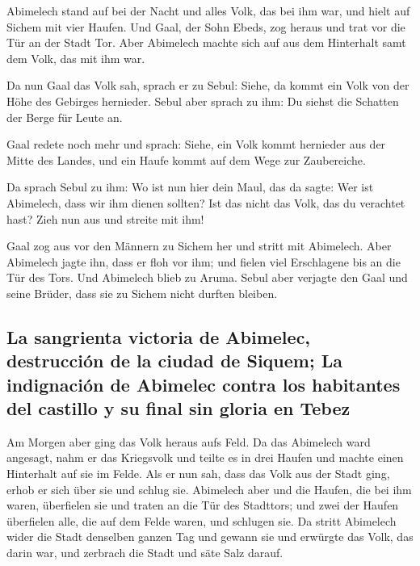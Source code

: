  Abimelech stand auf bei der Nacht und alles Volk, das
bei ihm war, und hielt auf Sichem mit vier Haufen.  Und
Gaal, der Sohn Ebeds, zog heraus und trat vor die Tür an der Stadt Tor.
Aber Abimelech machte sich auf aus dem Hinterhalt samt dem Volk, das mit
ihm war.

 Da nun Gaal das Volk sah, sprach er zu Sebul: Siehe, da
kommt ein Volk von der Höhe des Gebirges hernieder. Sebul aber sprach zu
ihm: Du siehst die Schatten der Berge für Leute an.

 Gaal redete noch mehr und sprach: Siehe, ein Volk kommt
hernieder aus der Mitte des Landes, und ein Haufe kommt auf dem Wege zur
Zaubereiche.

 Da sprach Sebul zu ihm: Wo ist nun hier dein Maul, das
da sagte: Wer ist Abimelech, dass wir ihm dienen sollten? Ist das nicht
das Volk, das du verachtet hast? Zieh nun aus und streite mit ihm!

 Gaal zog aus vor den Männern zu Sichem her und stritt
mit Abimelech.  Aber Abimelech jagte ihn, dass er floh
vor ihm; und fielen viel Erschlagene bis an die Tür des Tors.
 Und Abimelech blieb zu Aruma. Sebul aber verjagte den
Gaal und seine Brüder, dass sie zu Sichem nicht durften bleiben.

\hypertarget{la-sangrienta-victoria-de-abimelec-destrucciuxf3n-de-la-ciudad-de-siquem-la-indignaciuxf3n-de-abimelec-contra-los-habitantes-del-castillo-y-su-final-sin-gloria-en-tebez}{%
\subsection{La sangrienta victoria de Abimelec, destrucción de la ciudad
de Siquem; La indignación de Abimelec contra los habitantes del castillo
y su final sin gloria en
Tebez}\label{la-sangrienta-victoria-de-abimelec-destrucciuxf3n-de-la-ciudad-de-siquem-la-indignaciuxf3n-de-abimelec-contra-los-habitantes-del-castillo-y-su-final-sin-gloria-en-tebez}}

 Am Morgen aber ging das Volk heraus aufs Feld. Da das
Abimelech ward angesagt,  nahm er das Kriegsvolk und
teilte es in drei Haufen und machte einen Hinterhalt auf sie im Felde.
Als er nun sah, dass das Volk aus der Stadt ging, erhob er sich über sie
und schlug sie.  Abimelech aber und die Haufen, die bei
ihm waren, überfielen sie und traten an die Tür des Stadttors; und zwei
der Haufen überfielen alle, die auf dem Felde waren, und schlugen sie.
 Da stritt Abimelech wider die Stadt denselben ganzen Tag
und gewann sie und erwürgte das Volk, das darin war, und zerbrach die
Stadt und säte Salz darauf.

